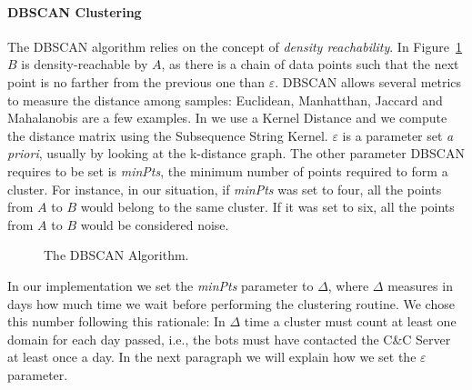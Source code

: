 \paragraph{DBSCAN Clustering} %
\label{par:dbscan_clustering}

The DBSCAN algorithm relies on the concept of \emph{density reachability}. In
Figure~\ref{fig:dbscan} $B$ is density-reachable by $A$, as there is a chain of data points
such that the next point is no farther from the previous one than $\varepsilon$.
DBSCAN allows several metrics to measure the distance among samples: Euclidean, Manhatthan, Jaccard and Mahalanobis are a few examples. In \thesystem we use a
Kernel Distance and we compute the distance matrix using the Subsequence String
Kernel.
$\varepsilon$ is a parameter set \emph{a priori}, usually by looking at the k-distance graph.
The other parameter DBSCAN requires to be set is \emph{minPts}, the minimum number of points required to
form a cluster. For instance, in our situation, if \emph{minPts} was set to four, all the
points from $A$ to $B$ would belong to the same cluster. If it was set to six, all the
points from $A$ to $B$ would be considered noise.
\begin{figure}[!htp]
    \centering
    \caption{The DBSCAN Algorithm.}
    \label{fig:dbscan}
\end{figure}
In our implementation we set the \emph{minPts} parameter to $\Delta$, where $\Delta$ measures in days how much time we wait before performing the clustering routine. We chose this number
following this rationale: In $\Delta$ time a cluster must count at least one domain
for each day passed, i.e., the bots must have contacted the C\&C Server at least once a day.
In the next paragraph we will explain how we set the $\varepsilon$ parameter.

